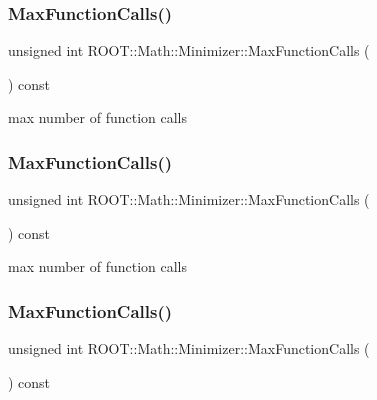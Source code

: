 \subsubsection{\texorpdfstring{MaxFunctionCalls()}{MaxFunctionCalls()}\hspace{0.1cm}{\footnotesize\ttfamily [1/3]}}
{\footnotesize\ttfamily unsigned int R\+O\+O\+T\+::\+Math\+::\+Minimizer\+::\+Max\+Function\+Calls (\begin{DoxyParamCaption}{ }\end{DoxyParamCaption}) const\hspace{0.3cm}{\ttfamily [inline]}}



max number of function calls 

\mbox{\label{classROOT_1_1Math_1_1Minimizer_a0d7f60c2e5b240258d32feed547b30a3}} 
\subsubsection{\texorpdfstring{MaxFunctionCalls()}{MaxFunctionCalls()}\hspace{0.1cm}{\footnotesize\ttfamily [2/3]}}
{\footnotesize\ttfamily unsigned int R\+O\+O\+T\+::\+Math\+::\+Minimizer\+::\+Max\+Function\+Calls (\begin{DoxyParamCaption}{ }\end{DoxyParamCaption}) const\hspace{0.3cm}{\ttfamily [inline]}}



max number of function calls 

\mbox{\label{classROOT_1_1Math_1_1Minimizer_a0d7f60c2e5b240258d32feed547b30a3}} 
\subsubsection{\texorpdfstring{MaxFunctionCalls()}{MaxFunctionCalls()}\hspace{0.1cm}{\footnotesize\ttfamily [3/3]}}
{\footnotesize\ttfamily unsigned int R\+O\+O\+T\+::\+Math\+::\+Minimizer\+::\+Max\+Function\+Calls (\begin{DoxyParamCaption}{ }\end{DoxyParamCaption}) const\hspace{0.3cm}{\ttfamily [inline]}}



